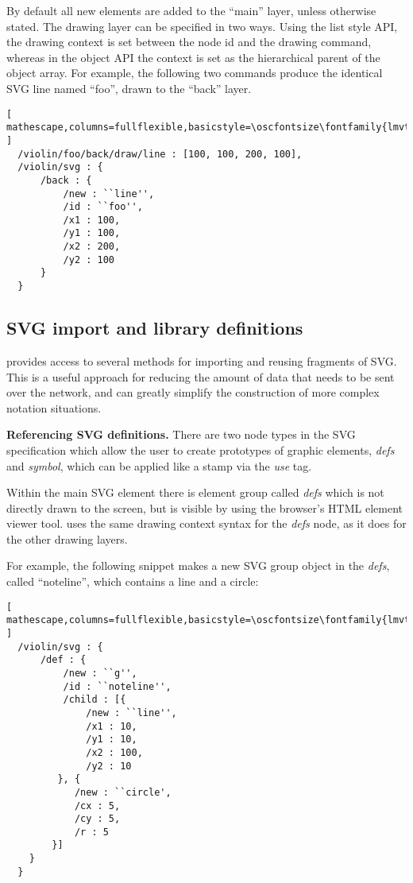 By default all new elements are added to the ``main'' layer, unless otherwise stated. The drawing layer can be specified in two ways. Using the list style API, the drawing context is set between the node id and the drawing command, whereas in the object API the context is set as the hierarchical parent of the object array. 
For example, the following two commands produce the identical SVG line named ``foo'', drawn to the ``back'' layer.

\begin{lstlisting}[ mathescape,columns=fullflexible,basicstyle=\oscfontsize\fontfamily{lmvtt}\selectfont ]
  /violin/foo/back/draw/line : [100, 100, 200, 100],
  /violin/svg : {
      /back : {
          /new : ``line'',
          /id : ``foo'',
          /x1 : 100,
          /y1 : 100,
          /x2 : 200,
          /y2 : 100
      }
  }
 \end{lstlisting}


\subsection{SVG import and library definitions}\label{sec:defs}
\drawsocket provides access to several methods for importing and reusing fragments of SVG.
This is a useful approach for reducing the amount of data that needs to be sent over the network, and can greatly simplify the construction of more complex notation situations.

\medskip
\noindent
\textbf{Referencing SVG definitions.} 
There are two node types in the SVG specification which allow the user to create prototypes of graphic elements, \textit{defs} and \textit{symbol}, which can be applied like a stamp via the \textit{use} tag. 

Within the \drawsocket main SVG element there is element group called \textit{defs} which is not directly drawn to the screen, but is visible by using the browser's HTML element viewer tool.
\drawsocket uses the same drawing context syntax for the \textit{defs} node, as it does for the other drawing layers.

For example, the following snippet makes a new SVG group object in the \textit{defs}, called ``noteline'', which contains a line and a circle:

\begin{lstlisting}[ mathescape,columns=fullflexible,basicstyle=\oscfontsize\fontfamily{lmvtt}\selectfont ]
  /violin/svg : {
      /def : {
          /new : ``g'',
          /id : ``noteline'',
          /child : [{
              /new : ``line'',
              /x1 : 10,
              /y1 : 10,
              /x2 : 100,
              /y2 : 10
         }, {
            /new : ``circle',
            /cx : 5,
            /cy : 5,
            /r : 5
        }]
    } 
  }
 \end{lstlisting}

